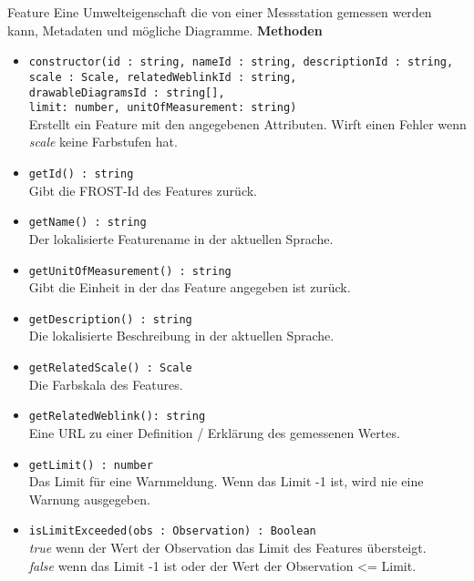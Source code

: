     \begin{Class}{Feature}
        Eine Umwelteigenschaft die von einer Messstation gemessen werden kann, Metadaten
        und mögliche Diagramme.
        \textbf{Methoden}
        \begin{itemize}
            \item \texttt{constructor(id : string, nameId : string, descriptionId : string,\\
             scale : Scale, relatedWeblinkId : string,
            \\drawableDiagramsId : string[],
            \\limit: number, unitOfMeasurement: string)}
            \\ Erstellt ein Feature mit den angegebenen Attributen.
            Wirft einen Fehler wenn \emph{scale} keine Farbstufen hat.
            \item \texttt{getId() : string}
            \\ Gibt die FROST-Id des Features zurück.
            \item \texttt{getName() : string}
            \\ Der lokalisierte Featurename in der aktuellen Sprache.
            \item \texttt{getUnitOfMeasurement() : string}
            \\ Gibt die Einheit in der das Feature angegeben ist zurück.
            \item \texttt{getDescription() : string}
            \\  Die lokalisierte Beschreibung in der aktuellen Sprache.
            \item \texttt{getRelatedScale() : Scale}
            \\ Die Farbskala des Features.
            \item \texttt{getRelatedWeblink(): string}
            \\ Eine URL zu einer Definition / Erklärung des gemessenen Wertes.
            \item \texttt{getLimit() : number}
            \\ Das Limit für eine Warnmeldung. Wenn das Limit -1 ist, wird nie eine Warnung ausgegeben.
            \item \texttt{isLimitExceeded(obs : Observation) : Boolean}
            \\ \emph{true} wenn der Wert der Observation das Limit des Features übersteigt.
            \\ \emph{false} wenn das Limit -1 ist oder der Wert der Observation <= Limit.
        \end{itemize}
    \end{Class}

